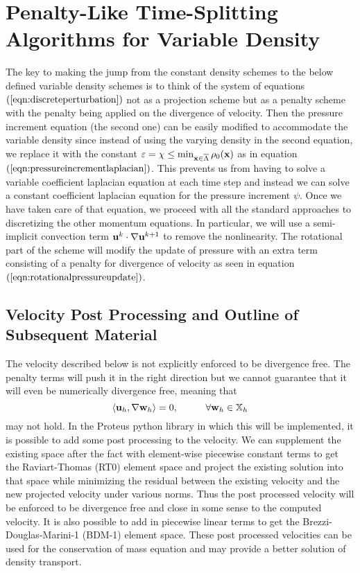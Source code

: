 \documentclass[letterpaper]{erdc}
\begin{document}
%
%
%
\section{Penalty-Like Time-Splitting Algorithms for Variable Density}\label{sec:variabledensityAlgorithm}
The key to making the jump from the constant density schemes to the below defined variable density schemes is to think of the system of equations~$\left(\ref{eqn:discreteperturbation}\right)$ not as a projection scheme but as a penalty scheme with the penalty being applied on the divergence of velocity.  Then the pressure increment equation (the second one) can be easily modified to accommodate the variable density since instead of using the varying density in the second equation, we replace it with the constant $\varepsilon = \chi \leq \min_{\textbf{x}\in\overline{\Lambda}}\rho_0(\textbf{x})$ as in equation~$\left(\ref{eqn:pressureincrementlaplacian}\right)$.  This prevents us from having to solve a variable coefficient laplacian equation at each time step and instead we can solve a constant coefficient laplacian equation for the pressure increment $\psi$.  Once we have taken care of that equation, we proceed with all the standard approaches to discretizing the other momentum equations.  In particular, we will use a semi-implicit convection term $\textbf{u}^{k}\cdot\nabla\textbf{u}^{k+1}$ to remove the nonlinearity.  The rotational part of the scheme will modify the update of pressure with an extra term consisting of a penalty for divergence of velocity as seen in equation~$\left(\ref{eqn:rotationalpressureupdate}\right)$.  

\subsection{Velocity Post Processing and Outline of Subsequent Material}
The velocity described below is not explicitly enforced to be divergence free.  The penalty terms will push it in the right direction but we cannot guarantee that it will even be numerically divergence free, meaning that 
\begin{equation}
  \left\langle \textbf{u}_h, \nabla\textbf{w}_h \right\rangle = 0, \hspace{1cm}\forall\textbf{w}_h\in\mathbb{X}_h
\end{equation}
may not hold.  In the Proteus python library in which this will be implemented, it is possible to add some post processing to the velocity.  We can supplement the existing space after the fact with element-wise piecewise constant terms to get the Raviart-Thomas (RT0) element space and project the existing solution into that space while minimizing the residual between the existing velocity and the new projected velocity under various norms.    Thus the post processed velocity will be enforced to be divergence free and close in some sense to the computed velocity.  It is also possible to add in piecewise linear terms to get the Brezzi-Douglas-Marini-1 (BDM-1) element space.  These post processed velocities can be used for the conservation of mass equation and may provide a better solution of density transport.
\end{document}
